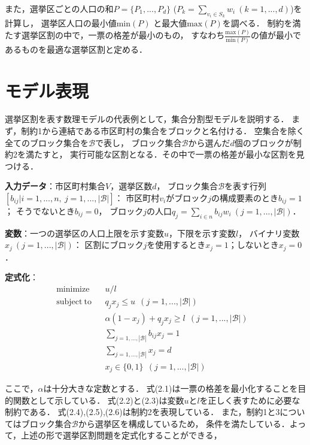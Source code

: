 また，選挙区ごとの人口の和$P=\{P_1,...,P_d\}$ ($P_k=\sum_{v_i\in S_k}w_i\ (k=1,...,d)$)を計算し，
選挙区人口の最小値$\mathrm{min}(P)$ と最大値$\mathrm{max}(P)$を調べる．
制約を満たす選挙区割の中で，一票の格差が最小のもの，
すなわち$\frac{\mathrm{max}(P)}{\mathrm{min}(P)}$の値が最小であるものを最適な選挙区割と定める．


\section{モデル表現}
選挙区割を表す数理モデルの代表例として，集合分割型モデル\cite{nemoto}を説明する．
まず，制約1から連結である市区町村の集合をブロックと名付ける．
空集合を除く全てのブロック集合を$\mathscr{B}$で表し，
ブロック集合$\mathscr{B}$から選んだ$d$個のブロックが制約2を満たすと，
実行可能な区割となる．その中で一票の格差が最小な区割を見つける．

\textbf{入力データ}：市区町村集合$V$，選挙区数$d$，
ブロック集合$\mathscr{B}$を表す行列$[b_{ij}|i=1,...,n,~j=1,...,|\mathscr{B}|]$：
市区町村$v_i$がブロック$j$の構成要素のとき$b_{ij}=1$；
そうでないとき$b_{ij}=0$，
ブロック$j$の人口$q_j=\sum_{i\in n}b_{ij}w_{i}~(j=1,...,|\mathscr{B}|)$．

\textbf{変数}：一つの選挙区の人口上限を示す変数$u$，下限を示す変数$l$，
バイナリ変数$x_j~(j=1,...,|\mathscr{B}|)$：
区割にブロック$j$を使用するとき$x_j=1$；しないとき$x_j=0$．

\textbf{定式化}：
\begin{align}
    &\mathrm{minimize} && u/l && \\
    &\mathrm{subject~to} && q_jx_j\leq u~~(j=1,...,|\mathscr{B}|) && \\
    & && \alpha(1-x_j)+q_jx_j\geq l~~(j=1,...,|\mathscr{B}|) && \\
    & && \sum_{j=1,...,|\mathscr{B}|}b_{ij}x_{j}=1 && \\
    & && \sum_{j=1,...,|\mathscr{B}|}x_j=d && \\
    & && x_j \in \{0,1\}~~(j=1,...,|\mathscr{B}|) &&
\end{align}

ここで，$\alpha$は十分大きな定数とする．
式(2.1)は一票の格差を最小化することを目的関数として示している．
式(2.2)と(2.3)は変数$u$と$l$を正しく表すために必要な制約である．
式(2.4),(2.5),(2.6)は制約2を表現している．
また，制約1と3についてはブロック集合$\mathscr{B}$から選挙区を構成しているため，
条件を満たしている．よって，上述の形で選挙区割問題を定式化することができる，